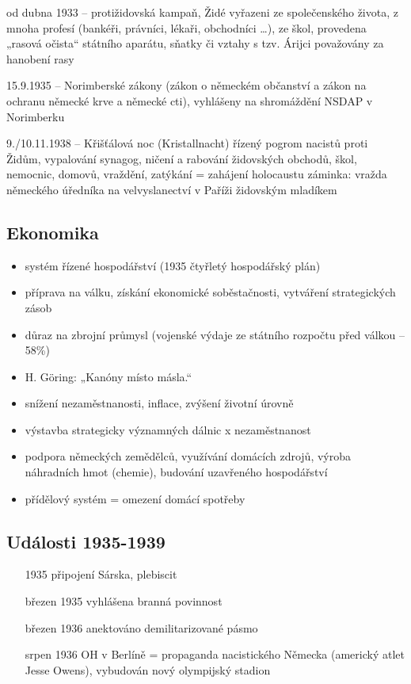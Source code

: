 \documentclass{article}
\begin{document}
od dubna 1933 – protižidovská kampaň, Židé vyřazeni ze společenského života, z mnoha profesí (bankéři, právníci, lékaři, obchodníci …), ze škol, provedena „rasová očista“ státního aparátu, sňatky či vztahy s tzv. Árijci považovány za hanobení rasy

15.9.1935 – Norimberské zákony (zákon o německém občanství a zákon na ochranu německé krve a německé cti), vyhlášeny na shromáždění NSDAP v Norimberku

9./10.11.1938 – Křišťálová noc (Kristallnacht)
řízený pogrom nacistů proti Židům, vypalování synagog, ničení a rabování židovských obchodů, škol, nemocnic, domovů, vraždění, zatýkání
= zahájení holocaustu
záminka: vražda německého úředníka na velvyslanectví v Paříži židovským mladíkem

\subsection*{Ekonomika}
\begin{itemize}
    \item systém řízené hospodářství (1935 čtyřletý hospodářský plán)
    \item příprava na válku, získání ekonomické soběstačnosti, vytváření strategických zásob
    \item důraz na zbrojní průmysl (vojenské výdaje ze státního rozpočtu před válkou – 58\%)
    \item H. Göring: „Kanóny místo másla.“
    \item snížení nezaměstnanosti, inflace, zvýšení životní úrovně
    \item výstavba strategicky významných dálnic x nezaměstnanost
    \item podpora německých zemědělců, využívání domácích zdrojů, výroba náhradních hmot (chemie), budování uzavřeného hospodářství
    \item přídělový systém = omezení domácí spotřeby
\end{itemize}

\subsection*{Události 1935-1939}
\begin{itemize}
    \item[1935] připojení Sárska, plebiscit
    \item [březen 1935] vyhlášena branná povinnost
    \item [březen 1936] anektováno demilitarizované pásmo
    \item [srpen 1936] OH v Berlíně = propaganda nacistického Německa (americký atlet Jesse Owens), vybudován nový olympijský stadion
\end{itemize}
\end{document}
